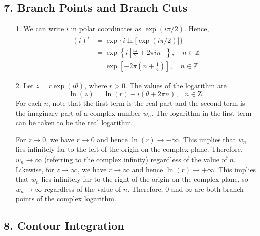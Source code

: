 \documentclass[10pt,a4paper]{article}
\begin{document}
\subsection*{7. Branch Points and Branch Cuts}

\begin{enumerate}
\item[1.]
We can write $i$ in polar coordinates as $\exp(i\pi/2).$ Hence,
\begin{align}
  (i)^i &= \exp\Big\{i \ln\big[\exp(i\pi/2)\big]\Big\} \\
  &= \exp\left\{i \left[\frac{i\pi}{2} + 2 \pi i n\right]\right\}, \quad n \in \mathbb{Z} \\
  &= \exp\left[- 2\pi\left(n+\frac{1}{4}\right) \right], \quad n \in \mathbb{Z}.
\end{align}

\item[2.]
Let $z = r\exp(i\theta)$, where $r > 0$. The values of the logarithm
are \begin{equation}
  \ln(z) = \ln(r) + i (\theta + 2\pi n), \;\;\;n \in \mathrm{Z}.
\end{equation}
For each $n$, note that the first term is the real part and the second
term is the imaginary part of a complex number $w_n$. The logarithm in
the first term can be taken to be the real logarithm.

For $z \rightarrow 0$, we have $r \rightarrow 0$ and hence
$\ln(r)\rightarrow -\infty$. This implies that $w_n$ lies infinitely
far to the left of the origin on the complex plane. Therefore, $w_n
\rightarrow \infty$ (referring to the complex infinity) regardless of
the value of $n$. Likewise, for $z \rightarrow \infty$, we have $r
\rightarrow \infty$ and hence $\ln(r)\rightarrow +\infty$. This
implies that $w_n$ lies infinitely far to the right of the origin on
the complex plane, so $w_n \rightarrow \infty$ regardless of the value
of $n$. Therefore, $0$ and $\infty$ are both branch points of the
complex logarithm.
\end{enumerate}

\subsection*{8. Contour Integration}
\end{document}
